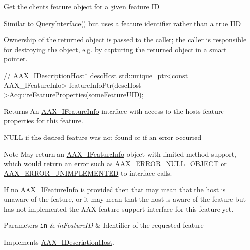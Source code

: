Get the client\textquotesingle{}s feature object for a given feature I\+D

Similar to {\ttfamily Query\+Interface()} but uses a feature identifier rather than a true I\+I\+D

Ownership of the returned object is passed to the caller; the caller is responsible for destroying the object, e.\+g. by capturing the returned object in a smart pointer.


\begin{DoxyCode}
\textcolor{comment}{// AAX\_IDescriptionHost* descHost}
std::unique\_ptr<const AAX\_IFeatureInfo> featureInfoPtr(descHost->AcquireFeatureProperties(someFeatureUID);
\end{DoxyCode}


\begin{DoxyReturn}{Returns}
An \hyperlink{a00100}{A\+A\+X\+\_\+\+I\+Feature\+Info} interface with access to the host\textquotesingle{}s feature properties for this feature. 

{\ttfamily N\+U\+L\+L} if the desired feature was not found or if an error occurred
\end{DoxyReturn}
\begin{DoxyNote}{Note}
May return an \hyperlink{a00100}{A\+A\+X\+\_\+\+I\+Feature\+Info} object with limited method support, which would return an error such as \hyperlink{a00207_a5f8c7439f3a706c4f8315a9609811937a647cce13fa531e3a46c6eab694048a9c}{A\+A\+X\+\_\+\+E\+R\+R\+O\+R\+\_\+\+N\+U\+L\+L\+\_\+\+O\+B\+J\+E\+C\+T} or \hyperlink{a00207_a5f8c7439f3a706c4f8315a9609811937a3b76994b32b97fcd56b19ef8032245df}{A\+A\+X\+\_\+\+E\+R\+R\+O\+R\+\_\+\+U\+N\+I\+M\+P\+L\+E\+M\+E\+N\+T\+E\+D} to interface calls.

If no \hyperlink{a00100}{A\+A\+X\+\_\+\+I\+Feature\+Info} is provided then that may mean that the host is unaware of the feature, or it may mean that the host is aware of the feature but has not implemented the A\+A\+X feature support interface for this feature yet.
\end{DoxyNote}

\begin{DoxyParams}[1]{Parameters}
\mbox{\tt in}  & {\em in\+Feature\+I\+D} & Identifier of the requested feature \\
\hline
\end{DoxyParams}


Implements \hyperlink{a00091_aa0d9e27d0207113f98c217d870bfa5e9}{A\+A\+X\+\_\+\+I\+Description\+Host}.

\hypertarget{a00133_aa5a445922084bc6c140d7e6c6f550f7f}{}
